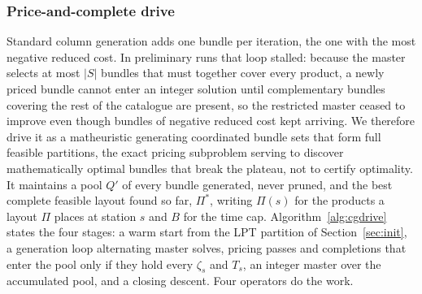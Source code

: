 \documentclass[]{interact}
\begin{document}
\subsubsection{Price-and-complete drive}\label{sec:cgdrive}
Standard column generation adds one bundle per iteration, the one with the most negative reduced cost. In preliminary runs that loop stalled: because the master selects at most $|S|$ bundles that must together cover every product, a newly priced bundle cannot enter an integer solution until complementary bundles covering the rest of the catalogue are present, so the restricted master ceased to improve even though bundles of negative reduced cost kept arriving. We therefore drive it as a matheuristic generating coordinated bundle sets that form full feasible partitions, the exact pricing subproblem serving to discover mathematically optimal bundles that break the plateau, not to certify optimality. It maintains a pool $Q'$ of every bundle generated, never pruned, and the best complete feasible layout found so far, $\Pi^{\ast}$, writing $\Pi(s)$ for the products a layout $\Pi$ places at station $s$ and $B$ for the time cap. Algorithm~\ref{alg:cgdrive} states the four stages: a warm start from the LPT partition of Section~\ref{sec:init}, a generation loop alternating master solves, pricing passes and completions that enter the pool only if they hold every $\zeta_s$ and $T_s$, an integer master over the accumulated pool, and a closing descent. Four operators do the work.
\end{document}
